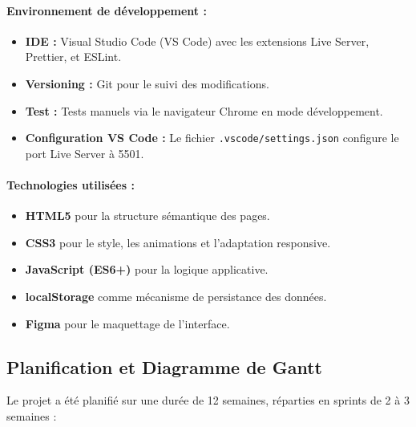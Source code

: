 \documentclass[12pt,a4paper,twoside]{report}
\begin{document}
\paragraph{Environnement de développement :}
\begin{itemize}
    \item \textbf{IDE :} Visual Studio Code (VS Code) avec les extensions Live Server, Prettier, et ESLint.
    \item \textbf{Versioning :} Git pour le suivi des modifications.
    \item \textbf{Test :} Tests manuels via le navigateur Chrome en mode développement.
    \item \textbf{Configuration VS Code :} Le fichier \texttt{.vscode/settings.json} configure le port Live Server à 5501.
\end{itemize}

\paragraph{Technologies utilisées :}
\begin{itemize}
    \item \textbf{HTML5} pour la structure sémantique des pages.
    \item \textbf{CSS3} pour le style, les animations et l'adaptation responsive.
    \item \textbf{JavaScript (ES6+)} pour la logique applicative.
    \item \textbf{localStorage} comme mécanisme de persistance des données.
    \item \textbf{Figma} pour le maquettage de l'interface.
\end{itemize}

\subsection{Planification et Diagramme de Gantt}

Le projet a été planifié sur une durée de 12 semaines, réparties en sprints de 2 à 3 semaines :
\end{document}
